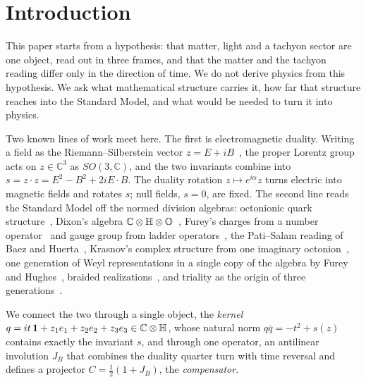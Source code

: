 \section{Introduction}\label{sec:intro}

This paper starts from a hypothesis: that matter, light and a tachyon sector are one object, read out in three frames, and that the matter
and the tachyon reading differ only in the direction of time.  We do not derive physics from this hypothesis.  We ask what mathematical
structure carries it, how far that structure reaches into the Standard Model, and what would be needed to turn it into physics.

Two known lines of work meet here.  The first is electromagnetic duality.  Writing a field as the Riemann--Silberstein vector \(z=E+iB\)~\cite{bialynicki},
the proper Lorentz group acts on \(z\in\mathbb C^3\) as \(SO(3,\mathbb C)\), and the two invariants combine into \(s=z\cdot z=E^2-B^2+2iE\cdot B\).  The
duality rotation \(z\mapsto e^{i\alpha}z\) turns electric into magnetic fields and rotates \(s\); null fields, \(s=0\), are fixed.  The second line
reads the Standard Model off the normed division algebras: octonionic quark structure~\cite{gunaydin}, Dixon's algebra
\(\mathbb C\otimes\mathbb H\otimes\mathbb O\)~\cite{dixon}, Furey's charges from a number operator~\cite{furey2015} and gauge group from ladder
operators~\cite{furey2018}, the Pati--Salam reading of Baez and Huerta~\cite{baezhuerta}, Krasnov's complex structure from one imaginary
octonion~\cite{krasnov}, one generation of Weyl representations in a single copy of the algebra by Furey and Hughes~\cite{fureyhughes}, braided
realizations~\cite{gresnigt}, and triality as the origin of three generations~\cite{boyle}.

We connect the two through a single object, the \emph{kernel} \(q=it\,\mathbf 1+z_1e_1+z_2e_2+z_3e_3\in\mathbb C\otimes\mathbb H\), whose natural norm
\(q\bar q=-t^2+s(z)\) contains exactly the invariant \(s\), and through one operator, an antilinear involution \(J_B\) that combines the duality quarter
turn with time reversal and defines a projector \(C=\tfrac12(1+J_B)\), the \emph{compensator}.

